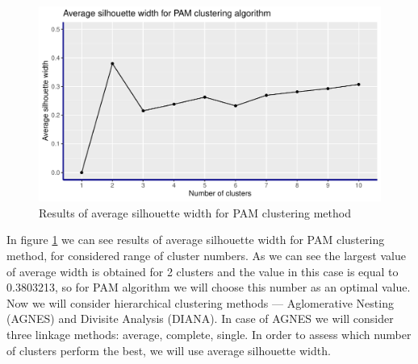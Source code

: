 \documentclass[11pt,a4paper]{article}\usepackage[]{graphicx}\usepackage[]{xcolor}
\makeatletter
\def\maxwidth{ %
  \ifdim\Gin@nat@width>\linewidth
    \linewidth
  \else
    \Gin@nat@width
  \fi
}
\newenvironment{knitrout}{}{} %
\makeatother
\begin{document}
	
\begin{knitrout}
\color{fgcolor}\begin{figure}
\includegraphics[width=\maxwidth]{figure/pam_silhouette-1} \caption[Results of average silhouette width for PAM clustering method]{Results of average silhouette width for PAM clustering method}\label{fig:pam_silhouette}
\end{figure}

\end{knitrout}
	
	In figure \ref{fig:pam_silhouette} we can see results of average silhouette width for PAM clustering method, for considered range of cluster numbers. As we can see the largest value of average width is obtained for 2 clusters and the value in this case is equal to 0.3803213, so for PAM algorithm we will choose this number as an optimal value.
	Now we will consider hierarchical clustering methods --- Aglomerative Nesting (AGNES) and Divisite Analysis (DIANA). In case of AGNES we will consider three linkage methods: average, complete, single. In order to assess which number of clusters perform the best, we will use average silhouette width.
	

	

	
\end{document}
